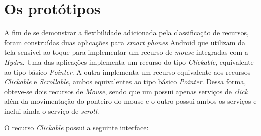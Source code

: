 \section{Os protótipos}
\label{sec:osPrototipos}

A fim de se demonstrar a flexibilidade adicionada pela classificação de recursos, foram construídas duas aplicações para \emph{smart phones} Android que utilizam da tela sensível ao toque para implementar um recurso de \emph{mouse} integradas com a \emph{Hydra}. Uma das aplicações implementa um recurso do tipo \emph{Clickable}, equivalente ao tipo básico \emph{Pointer}. A outra implementa um recurso equivalente aos recursos \emph{Clickable} e \emph{Scrollable}, ambos equivalentes ao tipo básico \emph{Pointer}. Dessa forma, obteve-se dois recursos de \emph{Mouse}, sendo que um possui apenas serviços de \emph{click} além da movimentação do ponteiro do mouse e o outro possui ambos os serviços e inclui ainda o serviço de \emph{scroll}. 

O recurso \emph{Clickable} possui a seguinte interface:

